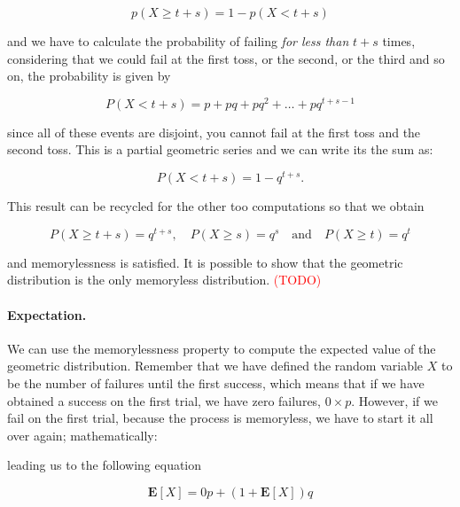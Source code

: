 \documentclass[12pt]{article}
\begin{document}
\begin{equation}
p( X \geq t + s ) = 1 - p( X < t + s )
\end{equation}

\noindent
and we have to calculate the probability of failing \textit{for less than} $t + s$ times,
considering that we could fail at the first toss, or the second, or the third and so on,
the probability is given by

\begin{equation}
P( X < t + s ) = 
p + pq + pq^{2} + \ldots + p q^{t + s - 1}
\end{equation}

\noindent
since all of these events are disjoint, you cannot fail at the first toss and the second toss.
This is a partial geometric series and we can write its the sum as:

\begin{equation}
P( X < t + s ) =
1 - q^{t + s}.
\end{equation}

\noindent
This result can be recycled for the other too computations so that we obtain

\begin{equation}
P( X \geq t + s ) =
q^{t + s},
\quad
P( X \geq s ) = 
q^{s}
\quad
\text{and}
\quad
P( X \geq t ) =
q^{t}
\end{equation}

\noindent
and memorylessness is satisfied.
It is possible to show that the geometric distribution is the only
memoryless distribution. \textcolor{red}{(TODO)}

\paragraph{Expectation.}
We can use the memorylessness property to compute the expected value
of the geometric distribution. Remember that we have defined 
the random variable $X$ to be the number of failures until the first success,
which means that if we have obtained a success on the first trial, we have zero failures,
$0 \times p $. However, if we fail on the first trial, because the process is memoryless,
we have to start it all over again; mathematically:




leading us to the following equation

\begin{equation}
\mathbf{E} [ X ] = 0 p + ( 1 + \mathbf{E} [X] ) q
\end{equation}
\end{document}
